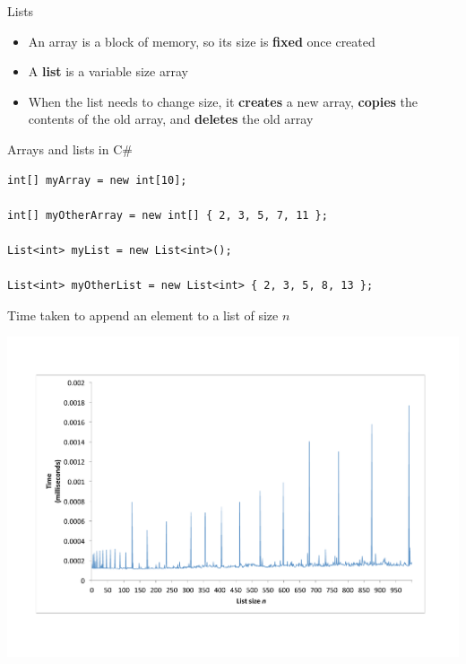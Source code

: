 \begin{frame}{Lists}
	\begin{itemize}
		\pause\item An array is a block of memory, so its size is \textbf{fixed} once created
		\pause\item A \textbf{list} is a variable size array
		\pause\item When the list needs to change size, it \textbf{creates} a new array,
			\textbf{copies} the contents of the old array, and \textbf{deletes} the old array
	\end{itemize}
\end{frame}

\begin{frame}[fragile]{Arrays and lists in C\#}
	\begin{lstlisting}
int[] myArray = new int[10];

int[] myOtherArray = new int[] { 2, 3, 5, 7, 11 };

List<int> myList = new List<int>();

List<int> myOtherList = new List<int> { 2, 3, 5, 8, 13 };
	\end{lstlisting}
\end{frame}

\begin{frame}{Time taken to append an element to a list of size $n$}
	\begin{center}
		\vspace{-5ex}
		\includegraphics[height=0.9\textheight]{list_append_timing}
	\end{center}
\end{frame}

